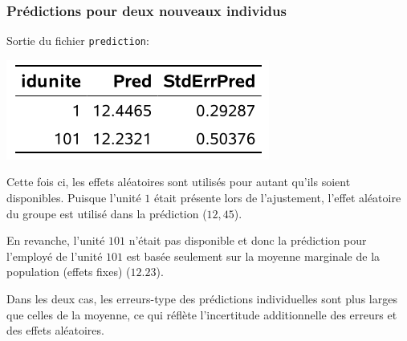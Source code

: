 \documentclass{beamer}
\begin{document}
\begin{frame}[fragile]
\frametitle{Prédictions pour deux nouveaux individus}

Sortie du fichier \texttt{prediction}:
\begin{center}
\includegraphics[width = 0.4\linewidth]{img/c6/diapos7-e22}
\end{center}
\bi
\item Cette fois ci, les effets aléatoires sont utilisés pour autant qu'ils soient disponibles. Puisque l'unité $1$ était présente lors de l'ajustement, l'effet aléatoire du groupe est utilisé dans la prédiction ($12,45$).
\item En revanche, l'unité
$101$ n'était pas disponible et donc la prédiction pour l'employé de l'unité $101$ est basée seulement sur la moyenne marginale de la population (effets fixes) ($12.23$).
\item Dans les deux cas, les erreurs-type des prédictions individuelles sont plus larges que celles de la moyenne, ce qui réflète l'incertitude additionnelle des erreurs et des effets aléatoires.
\ei
\end{frame}
\end{document}
